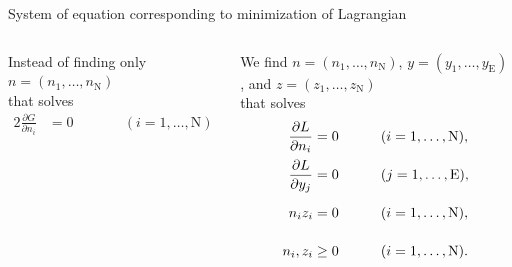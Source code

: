 \begin{frame}{System of equation corresponding to minimization of Lagrangian}

\begin{columns}[t]
	

Instead of finding \alert{only $n=(n_{1},\ldots,n_{\text{N}})$} \\
that solves\\[6pt] 
\begin{alignat*}{2}
\frac{\partial G}{\partial n_{i}} & =0 & \qquad & (i=1,\ldots,\text{N})
\end{alignat*}

	
We find \alert{$n=(n_{1},\ldots,n_{\text{N}})$}, \alert{$y=(y_{1},\ldots,y_{\text{E}})$},
and \alert{$z=(z_{1},\ldots,z_{\text{N}})$} \\
that solves 
\begin{alignat*}{2}
\frac{\partial L}{\partial n_{i}} & =0 & \qquad\vphantom{\frac{\partial L}{\partial y_{j}}} & (i=1,\ldots,\text{N}),\\
\frac{\partial L}{\partial y_{j}} & =0 & \vphantom{\frac{\partial L}{\partial y_{j}}} & (j=1,\ldots,\text{E}),\\
n_{i}z_{i} & =0 & \vphantom{\frac{\partial L}{\partial y_{j}}} & (i=1,\ldots,\text{N}),\\
n_{i},z_{i} & \geq0 & \vphantom{\frac{\partial L}{\partial y_{j}}} & (i=1,\ldots,\text{N}).
\end{alignat*}

\end{columns}

\end{frame}
%
%
